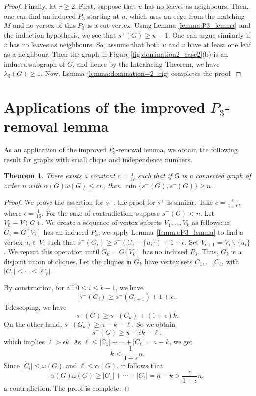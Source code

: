 \documentclass{article}
\newtheorem{theorem}{Theorem}[section]
\newcommand{\abs}[1]{|#1|}
\begin{document}
\begin{proof}
Finally, let $r\ge 2$. First, suppose that $u$ has no leaves as neighbours. Then, one can find an induced $P_3$ starting at $u$, which uses an edge from the matching $M$ and no vertex of this $P_3$ is a cut-vertex. Using Lemma \ref{lemma:P3_lemma} and the induction hypothesis, we see that $s^+(G)\ge n-1$. One can argue similarly if $v$ has no leaves as neighbours. So, assume that both $u$ and $v$ have at least one leaf as a neighbour. Then the graph in Figure \ref{fig:domination2_case2}(b) is an induced subgraph of $G$, and hence by the Interlacing Theorem, we have $\lambda_3(G) \geq 1$. Now, Lemma \ref{lemma:domination=2_eig} completes the proof.
\end{proof}


\section{Applications of the improved $P_3$-removal lemma}\label{section:P_3_applications}

As an application of the improved $P_3$-removal lemma, we obtain the following result for graphs with small clique and independence numbers.

\begin{theorem}\label{thm:clique_independence}
There exists a constant $c = \frac{1}{17}$ such that if $G$ is a connected graph of order $n$ with $\alpha(G) \omega(G) \leq cn$, then $\min\{s^+(G), s^-(G)\} \geq n$.
\end{theorem}

\begin{proof} We prove the assertion for $s^-$; the proof for $s^+$ is similar. Take $c = \frac{\epsilon}{1 + \epsilon}$, where $\epsilon = \frac{1}{16}$. For the sake of contradiction, suppose $s^-(G) < n$. Let $V_0 = V(G)$. We create a sequence of vertex subsets $V_1, \ldots, V_k$ as follows: if $G_i = G[V_i]$ has an induced $P_3$, we apply Lemma~\ref{lemma:P3_lemma} to find a vertex $u_i \in V_i$ such that $s^-(G_i) \geq s^-(G_i-\{u_i\}) + 1 + \epsilon$. Set $V_{i + 1} = V_i \backslash \{u_i\}$. We repeat this operation until $G_k = G[V_k]$ has no induced $P_3$. Thus, $G_k$ is a disjoint union of cliques. Let the cliques in $G_k$ have vertex sets $C_1, \ldots, C_{\ell}$, with $\abs{C_1} \leq \cdots \leq \abs{C_{\ell}}$.

By construction, for all $0\le i\le k-1$, we have 
\[ s^-(G_i) \geq s^-(G_{i + 1}) + 1 + \epsilon.\]
Telescoping, we have
\[s^-(G) \geq s^-(G_k) + (1 + \epsilon) k.\]
On the other hand, $s^-(G_k) \ge n - k - \ell$. So we obtain
 \[s^-(G) \geq n + \epsilon k - \ell,\]
 which implies $\ell > \epsilon k$. As $\ell \leq \abs{C_1} + \cdots + \abs{C_{\ell}} = n - k$, we get 
 \[k < \frac{1}{1 + \epsilon} n.\]
Since $\abs{C_i} \leq \omega(G)$ and $\ell \leq \alpha(G)$, it follows that
\[\alpha(G) \omega(G) \ge \abs{C_1} + \cdots + \abs{C_{\ell}} = n - k > \frac{\epsilon}{1+\epsilon} n,\]
a contradiction. The proof is complete.
\end{proof}
\end{document}
